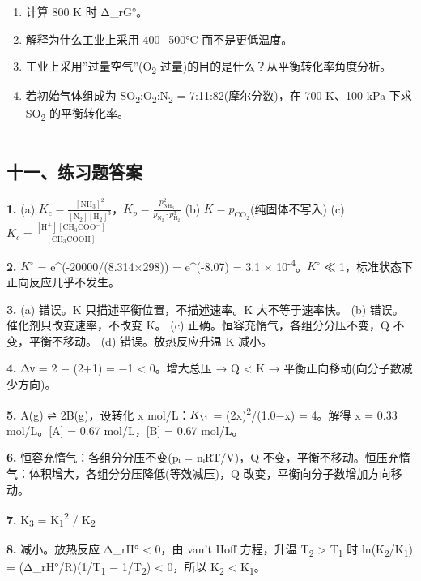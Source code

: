 \documentclass[a4paper,11pt]{ctexart}
\providecommand{\tightlist}{\setlength{\itemsep}{0pt}\setlength{\parskip}{0pt}}
\begin{document}
\begin{enumerate}
\def\labelenumi{(\alph{enumi})}
\tightlist
\item
  计算 800 K 时 Δ\_rG°。
\item
  解释为什么工业上采用 400−500°C 而不是更低温度。
\item
  工业上采用''过量空气''(O\textsubscript{2} 过量)的目的是什么？从平衡转化率角度分析。
\item
  若初始气体组成为 SO\textsubscript{2}:O\textsubscript{2}:N\textsubscript{2} = 7:11:82(摩尔分数)，在 700 K、100 kPa 下求 SO\textsubscript{2} 的平衡转化率。
\end{enumerate}

\begin{center}\rule{0.5\linewidth}{0.5pt}\end{center}

\subsection{十一、练习题答案}\label{ux5341ux4e00ux7ec3ux4e60ux9898ux7b54ux6848}

\textbf{1.}
(a) \(K_c = \frac{[\mathrm{NH_3}]^2}{[\mathrm{N_2}][\mathrm{H_2}]^3}\)，\(K_p = \frac{p_{\mathrm{NH_3}}^2}{p_{\mathrm{N_2}} \cdot p_{\mathrm{H_2}}^3}\)
(b) \(K = p_{\mathrm{CO_2}}\)(纯固体不写入)
(c) \(K_c = \frac{[\mathrm{H^+}][\mathrm{CH_3COO^-}]}{[\mathrm{CH_3COOH}]}\)

\textbf{2.} \(K^{\circ}\) = e\^{}(-20000/(8.314×298)) = e\^{}(-8.07) = 3.1 × 10\textsuperscript{-4}。\(K^{\circ}\) ≪ 1，标准状态下正向反应几乎不发生。

\textbf{3.}
(a) 错误。K 只描述平衡位置，不描述速率。K 大不等于速率快。
(b) 错误。催化剂只改变速率，不改变 K。
(c) 正确。恒容充惰气，各组分分压不变，Q 不变，平衡不移动。
(d) 错误。放热反应升温 K 减小。

\textbf{4.} Δν = 2 − (2+1) = −1 \textless{} 0。增大总压 → Q \textless{} K → 平衡正向移动(向分子数减少方向)。

\textbf{5.} A(g) ⇌ 2B(g)，设转化 x mol/L：\(K_{\1}\) = (2x)\textsuperscript{2}/(1.0−x) = 4。解得 x = 0.33 mol/L。{[}A{]} = 0.67 mol/L，{[}B{]} = 0.67 mol/L。

\textbf{6.} 恒容充惰气：各组分分压不变(pᵢ = nᵢRT/V)，Q 不变，平衡不移动。恒压充惰气：体积增大，各组分分压降低(等效减压)，Q 改变，平衡向分子数增加方向移动。

\textbf{7.} K\textsubscript{3} = K\textsubscript{1}\textsuperscript{2} / K\textsubscript{2}

\textbf{8.} 减小。放热反应 Δ\_rH° \textless{} 0，由 van't Hoff 方程，升温 T\textsubscript{2} \textgreater{} T\textsubscript{1} 时 ln(K\textsubscript{2}/K\textsubscript{1}) = (Δ\_rH°/R)(1/T\textsubscript{1} − 1/T\textsubscript{2}) \textless{} 0，所以 K\textsubscript{2} \textless{} K\textsubscript{1}。
\end{document}
